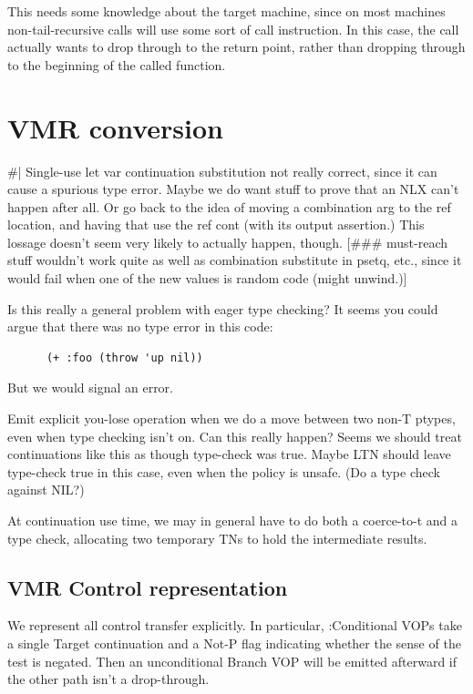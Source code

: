 This needs some knowledge about the target machine, since on most machines
non-tail-recursive calls will use some sort of call instruction.  In this case,
the call actually wants to drop through to the return point, rather than
dropping through to the beginning of the called function.

\chapter{VMR conversion}

\#|
Single-use let var continuation substitution not really correct, since it can
cause a spurious type error.  Maybe we do want stuff to prove that an NLX can't
happen after all.  Or go back to the idea of moving a combination arg to the
ref location, and having that use the ref cont (with its output assertion.)
This lossage doesn't seem very likely to actually happen, though.
[\#\#\# must-reach stuff wouldn't work quite as well as combination substitute in
psetq, etc., since it would fail when one of the new values is random code
(might unwind.)]

Is this really a general problem with eager type checking?  It seems you could
argue that there was no type error in this code:

\begin{verbatim}
      (+ :foo (throw 'up nil))
\end{verbatim}

But we would signal an error.


Emit explicit you-lose operation when we do a move between two non-T ptypes,
even when type checking isn't on.  Can this really happen?  Seems we should
treat continuations like this as though type-check was true.  Maybe LTN should
leave type-check true in this case, even when the policy is unsafe.  (Do a type
check against NIL?)

At continuation use time, we may in general have to do both a coerce-to-t and a
type check, allocating two temporary TNs to hold the intermediate results.


\section{VMR Control representation}

We represent all control transfer explicitly.  In particular, :Conditional VOPs
take a single Target continuation and a Not-P flag indicating whether the sense
of the test is negated.  Then an unconditional Branch VOP will be emitted
afterward if the other path isn't a drop-through.

